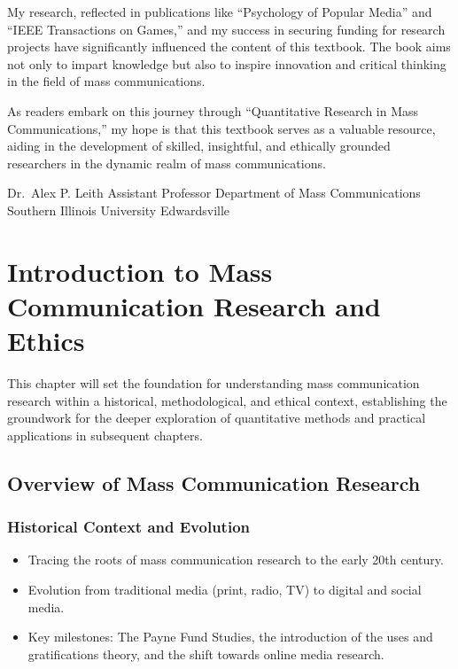 \documentclass[
]{book}
\begin{document}
My research, reflected in publications like ``Psychology of Popular Media'' and ``IEEE Transactions on Games,'' and my success in securing funding for research projects have significantly influenced the content of this textbook. The book aims not only to impart knowledge but also to inspire innovation and critical thinking in the field of mass communications.

As readers embark on this journey through ``Quantitative Research in Mass Communications,'' my hope is that this textbook serves as a valuable resource, aiding in the development of skilled, insightful, and ethically grounded researchers in the dynamic realm of mass communications.

Dr.~Alex P. Leith
Assistant Professor
Department of Mass Communications
Southern Illinois University Edwardsville

\hypertarget{introduction-to-mass-communication-research-and-ethics}{%
\chapter*{Introduction to Mass Communication Research and Ethics}\label{introduction-to-mass-communication-research-and-ethics}}

This chapter will set the foundation for understanding mass communication research within a historical, methodological, and ethical context, establishing the groundwork for the deeper exploration of quantitative methods and practical applications in subsequent chapters.

\hypertarget{overview-of-mass-communication-research}{%
\section*{Overview of Mass Communication Research}\label{overview-of-mass-communication-research}}

\hypertarget{historical-context-and-evolution}{%
\subsection*{Historical Context and Evolution}\label{historical-context-and-evolution}}

\begin{itemize}
\item
  Tracing the roots of mass communication research to the early 20th century.
\item
  Evolution from traditional media (print, radio, TV) to digital and social media.
\item
  Key milestones: The Payne Fund Studies, the introduction of the uses and gratifications theory, and the shift towards online media research.
\end{itemize}
\end{document}
